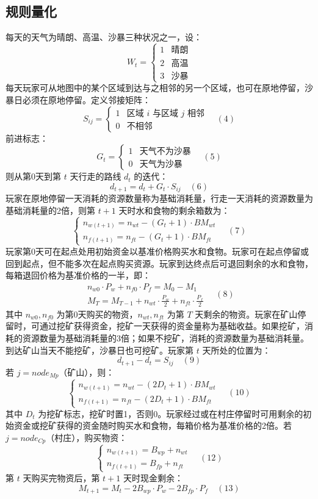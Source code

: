 \documentclass[UTF8]{article}
\begin{document}
\subsection*{规则量化}
每天的天气为晴朗、高温、沙暴三种状况之一，设：
\[
W_t = \begin{cases}
1 & \text{晴朗} \\
2 & \text{高温} \\
3 & \text{沙暴}
\end{cases}
\]
每天玩家可从地图中的某个区域到达与之相邻的另一个区域，也可在原地停留，沙暴日必须在原地停留。定义邻接矩阵：
\[
S_{ij} = \begin{cases}
1 & \text{区域 } i \text{ 与区域 } j \text{ 相邻} \\
0 & \text{不相邻}
\end{cases} \quad (4)
\]
前进标志：
\[
G_t = \begin{cases}
1 & \text{天气不为沙暴} \\
0 & \text{天气为沙暴}
\end{cases} \quad (5)
\]
则从第0天到第 \(t\) 天行走的路线 \(d_t\) 的迭代：
\[
d_{t+1} = d_t + G_t \cdot S_{ij} \quad (6)
\]
玩家在原地停留一天消耗的资源数量称为基础消耗量，行走一天消耗的资源数量为基础消耗量的2倍，则第 \(t+1\) 天时水和食物的剩余箱数为：
\[
\begin{cases}
n_{w(t+1)} = n_{wt} - (G_t + 1) \cdot BM_{wt} \\
n_{f(t+1)} = n_{ft} - (G_t + 1) \cdot BM_{ft}
\end{cases} \quad (7)
\]
玩家第0天可在起点处用初始资金以基准价格购买水和食物。玩家可在起点停留或回到起点，但不能多次在起点购买资源。玩家到达终点后可退回剩余的水和食物，每箱退回价格为基准价格的一半，即：
\[
\begin{array}{r}
n_{w0} \cdot P_w + n_{f0} \cdot P_f = M_0 - M_1 \\
M_T = M_{T-1} + n_{wt} \cdot \frac{P_w}{2} + n_{ft} \cdot \frac{P_f}{2}
\end{array} \quad (8)
\]
其中 \(n_{w0}, n_{f0}\) 为第0天购买的物资，\(n_{wt}, n_{ft}\) 为第 \(T\) 天剩余的物资。玩家在矿山停留时，可通过挖矿获得资金，挖矿一天获得的资金量称为基础收益。如果挖矿，消耗的资源数量为基础消耗量的3倍；如果不挖矿，消耗的资源数量为基础消耗量。到达矿山当天不能挖矿，沙暴日也可挖矿。玩家第 \(t\) 天所处的位置为：
\[
d_{t+1} - d_t = S_{ij} \quad (9)
\]
若 \(j = node_{Mp}\)（矿山），则：
\[
\begin{cases}
n_{w(t+1)} = n_{wt} - (2D_t + 1) \cdot BM_{wt} \\
n_{f(t+1)} = n_{ft} - (2D_t + 1) \cdot BM_{ft}
\end{cases} \quad (10)
\]
其中 \(D_t\) 为挖矿标志，挖矿时置1，否则0。玩家经过或在村庄停留时可用剩余的初始资金或挖矿获得的资金随时购买水和食物，每箱价格为基准价格的2倍。若 \(j = node_{Cp}\)（村庄），购买物资：
\[
\begin{cases}
n_{w(t+1)} = B_{wp} + n_{wt} \\
n_{f(t+1)} = B_{fp} + n_{ft}
\end{cases} \quad (12)
\]
第 \(t\) 天购买完物资后，第 \(t+1\) 天时现金剩余：
\[
M_{t+1} = M_t - 2B_{wp} \cdot P_w - 2B_{fp} \cdot P_f \quad (13)
\]
\end{document}
